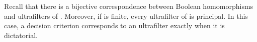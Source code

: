 \documentclass{llncs}
\numberwithin{equation}{section}
\begin{document}
Recall that there is a bijective correspondence between Boolean homomorphisms  and ultrafilters of . Moreover, if  is finite, every ultrafilter of  is principal. In this case, a decision criterion corresponds to an ultrafilter exactly when it is dictatorial.

\begin{comment}
\subsection{Examples of Selfextensional Logics}

\subsubsection{Modal logic.}

Modal logic (see e.g. \cite{BRV01}) is used to formalize propositions involving statements like ``it is possible that'' (modal statements), ``it will be that'' (temporal statements), ``it is obligatory that'' (deontic statements), ``I know that'' (epistemic statements), ``I believe that'' (doxastic statements), and so on. Typically, we use  to denote that  is necessary,  is going to be true, I know that , etc., and  to denote that  is possible,  will be true sometime in the future,  is consistent with my knowledge, etc. The formulas of modal logic can be defined as follows:



A normal modal logic  is defined as a set of formulas (called the \emph{theorems} of ) in the language defined above which contains all the propositional logic tautologies, formulas of the form , and is closed under modus ponens (from  and  get ), substitution and necessitation (from  get ).

Given a normal modal logic , the weak consequence relation (see \cite{Ja95}) is defined as follows:\\

 is weakly deducible in  from a set of formulas  if  belongs to the smallest set including , all the theorems of  and closed under modus ponens. It can be shown that  is weakly deducible in  from a set of formulas  iff there is a finite  such that  is a theorem of . 

It can be checked that for the interderivability relation  of  is compatible with the connectives in the language: if  and , then ,  and . Therefore,  is a congruence relation of the formula algebra , and thus  with the weak deducibility relation is a selfextensional logic.


\end{comment}
\end{document}
